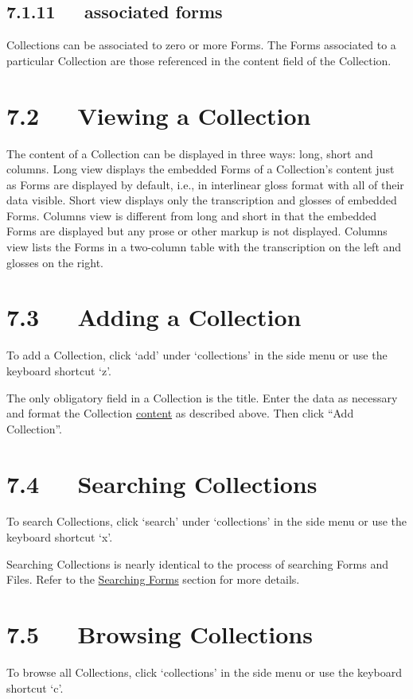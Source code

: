 \documentclass[letterpaper,10pt,english]{sphinxmanual}
\begin{document}
\subsection{7.1.11   associated forms}
\label{user_guide:associated-forms}
Collections can be associated to zero or more Forms.  The Forms associated to a
particular Collection are those referenced in the content field of the
Collection.


\section{7.2   Viewing a Collection}
\label{user_guide:viewing-a-collection}
The content of a Collection can be displayed in three ways: long, short and
columns.  Long view displays the embedded Forms of a Collection's content just
as Forms are displayed by default, i.e., in interlinear gloss format with all of
their data visible.  Short view displays only the transcription and glosses of
embedded Forms.  Columns view is different from long and short in that the
embedded Forms are displayed but any prose or other markup is not displayed.
Columns view lists the Forms in a two-column table with the transcription on the
left and glosses on the right.


\section{7.3   Adding a Collection}
\label{user_guide:adding-a-collection}
To add a Collection, click `add' under `collections' in the side menu or use the
keyboard shortcut `z'.

The only obligatory field in a Collection is the title.  Enter the data as
necessary and format the Collection {\hyperref[user_guide:content]{content}} as described above.  Then click
``Add Collection''.


\section{7.4   Searching Collections}
\label{user_guide:searching-collections}
To search Collections, click `search' under `collections' in the side menu or
use the keyboard shortcut `x'.

Searching Collections is nearly identical to the process of searching Forms and
Files.  Refer to the {\hyperref[user_guide:searching-forms]{Searching Forms}} section for more details.


\section{7.5   Browsing Collections}
\label{user_guide:browsing-collections}
To browse all Collections, click `collections' in the side menu or use the
keyboard shortcut `c'.
\end{document}
